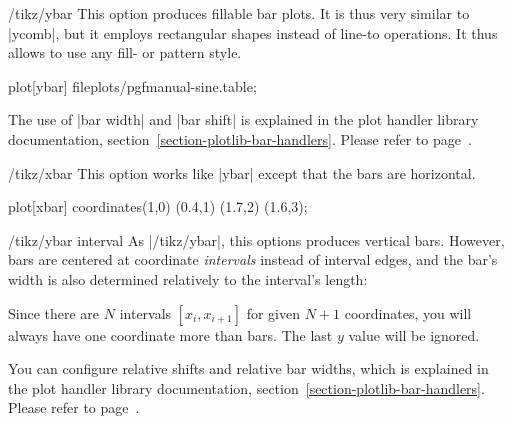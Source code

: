 \begin{key}{/tikz/ybar}
  This option produces fillable bar plots. It is thus very similar to
  |ycomb|, but it employs rectangular shapes instead of line-to
  operations. It thus allows to use any fill- or pattern style. 

\begin{codeexample}[]
\tikz\draw[draw=blue,fill=blue!60!black] plot[ybar] file{plots/pgfmanual-sine.table};
\end{codeexample}

\begin{codeexample}[]
\end{codeexample}
  The use of |bar width| and |bar shift| is explained in the plot
  handler library documentation,
  section~\ref{section-plotlib-bar-handlers}. Please refer to
  page~\pageref{key-bar-width}.  
\end{key}

\begin{key}{/tikz/xbar}
  This option works like |ybar| except that the bars are horizontal.

\begin{codeexample}[]
\tikz \draw[pattern=north west lines] plot[xbar]
   coordinates{(1,0) (0.4,1) (1.7,2) (1.6,3)};
\end{codeexample}
\end{key}

\begin{key}{/tikz/ybar interval}
  As |/tikz/ybar|, this options produces vertical bars. However, bars
  are centered at coordinate \emph{intervals} instead of interval
  edges, and the bar's width is also determined relatively to the
  interval's length: 

\begin{codeexample}[]
\end{codeexample}
  Since there are $N$ intervals $[x_i,x_{i+1}]$ for given $N+1$
  coordinates, you will always have one coordinate more than bars. The
  last $y$ value will be ignored. 

  You can configure relative shifts and relative bar widths, which is
  explained in the plot handler library documentation,
  section~\ref{section-plotlib-bar-handlers}. Please refer to
  page~\pageref{key-bar-interval-width}. 
\end{key}

